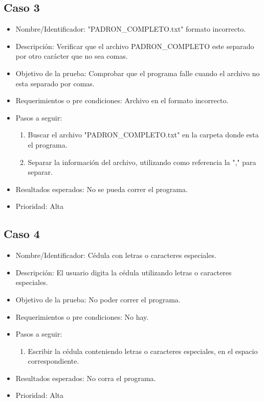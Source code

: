 \documentclass[conference]{IEEEtran}
\begin{document}
\subsection{Caso 3}
\begin{itemize}
\item Nombre/Identificador: "PADRON\_COMPLETO.txt" formato incorrecto.
\item Descripción: Verificar que el archivo PADRON\_COMPLETO este separado por otro carácter que no sea comas.
\item Objetivo de la prueba: Comprobar que el programa falle cuando el archivo no esta separado por comas. 
\item Requerimientos o pre condiciones: Archivo en el formato incorrecto.
\item Pasos a seguir: 
\begin{enumerate}
\item Buscar el archivo "PADRON\_COMPLETO.txt" en la carpeta donde esta el programa.
\item Separar la información del archivo, utilizando como referencia la "," para separar.
\end{enumerate}
\item Resultados esperados: No se pueda correr el programa.
\item Prioridad: Alta
\end{itemize}

\subsection{Caso 4}
\begin{itemize}
\item Nombre/Identificador: Cédula con letras o caracteres especiales.
\item Descripción: El usuario digita la cédula utilizando letras o caracteres especiales.
\item Objetivo de la prueba: No poder correr el programa.
\item Requerimientos o pre condiciones: No hay.
\item Pasos a seguir: 
\begin{enumerate}
\item Escribir la cédula conteniendo letras o caracteres especiales, en el espacio correspondiente.
\end{enumerate}
\item Resultados esperados: No corra el programa.
\item Prioridad: Alta
\end{itemize}
\end{document}

